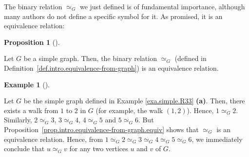 \documentclass[numbers=enddot,12pt,final,onecolumn,notitlepage]{scrartcl}%
\theoremstyle{definition}
\newtheorem{prop}[theo]{Proposition}
\newenvironment{proposition}[1][]
{\begin{prop}[#1]\begin{leftbar}}
{\end{leftbar}\end{prop}}
\newtheorem{exam}[theo]{Example}
\newenvironment{example}[1][]
{\begin{exam}[#1]\begin{leftbar}}
{\end{leftbar}\end{exam}}
\newcommand{\tup}[1]{\left( #1 \right)}
\begin{document}
The binary relation $\simeq_G$ we just defined is of fundamental
importance, although many authors do not define a specific symbol for
it. As promised, it is an equivalence relation:

\begin{proposition} \label{prop.intro.equivalence-from-graph.equiv}
Let $G$ be a simple graph. Then, the binary relation $\simeq_G$
(defined in Definition~\ref{def.intro.equivalence-from-graph}) is an
equivalence relation.
\end{proposition}

\begin{example} \label{exa.intro.equivalence-from-graph.2}
Let $G$ be the simple graph defined in
Example \ref{exa.simple.R33} \textbf{(a)}.
Then, there exists a walk from $1$ to $2$ in $G$ (for example,
the walk $\tup{1, 2}$).
Hence, $1 \simeq_G 2$.
Similarly, $2 \simeq_G 3$, $3 \simeq_G 4$, $4 \simeq_G 5$ and
$5 \simeq_G 6$.
But Proposition~\ref{prop.intro.equivalence-from-graph.equiv}
shows that $\simeq_G$ is an equivalence relation.
Hence, from
$1 \simeq_G 2 \simeq_G 3 \simeq_G 4 \simeq_G 5 \simeq_G 6$,
we immediately conclude that $u \simeq_G v$ for any two
vertices $u$ and $v$ of $G$.
\end{example}
\end{document}
